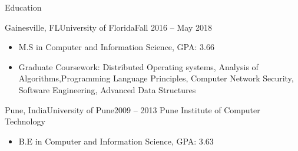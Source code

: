 \documentclass[]{mcdowellcv}
\begin{document}
	\begin{cvsection}{Education}
		\begin{cvsubsection}{Gainesville, FL}{University of Florida}{Fall 2016 -- May 2018}
			\begin{itemize}
				\item M.S in Computer and Information Science,  GPA: 3.66
				\item  Graduate Coursework: Distributed Operating systems, Analysis of Algorithms,Programming Language Principles, Computer Network
			Security, Software Engineering, Advanced Data Structures
			
		\end{itemize}
		\end{cvsubsection}
		\begin{cvsubsection}{Pune, India}{University of Pune}{2009 -- 2013}
			Pune Institute of Computer Technology	
		\begin{itemize}
				\item B.E in Computer and Information Science,  GPA: 3.63
		\end{itemize}
		\end{cvsubsection}

	\end{cvsection}
	
\end{document}
